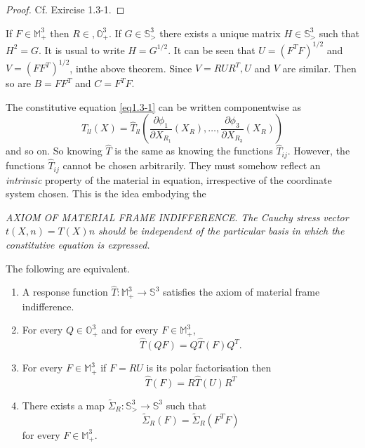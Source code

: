\begin{proof}
Cf. Exircise 1.3-1. 
\end{proof}

\begin{dashremark}%
If $F \in \mathbb{M}^3_+$ then $R \in , \mathbb{O}^3_+$. If $G \in
\mathbb{S}^3_>$ there exists a unique matrix $H \in \mathbb{S}^3_>$
such that $H^2=G$. It is usual to write $H =G^{1/2}$. It can be seen
that $U=(F^TF)^{1/2}$ and $V= (FF^T)^{1/2}$, in\pageoriginale the above
theorem. Since $V= R U R^T, U$ and $V$ are similar. Then so are $B
=FF^T$ and $C=F^TF$.  
\end{dashremark}

The constitutive equation \eqref{eq1.3-1} can be written componentwise as 
$$
T_{ll}(X)= \hat{T}_{ll} \left( \frac{\partial \phi_1}{\partial
  X_{R_1}}(X_R), \ldots , \frac{\partial \phi_3}{\partial
  X_{R_3}}(X_R)\right) 
$$
and so on. So knowing $\hat{T}$ is the same as knowing the functions
$\hat{T}_{ij}$. However, the functions $\hat{T}_{ij}$ cannot be chosen
arbitrarily. They must somehow reflect an \textit{intrinsic} property
of the material in equation, irrespective of the coordinate system
chosen. This is the idea embodying the  

\medskip
\noindent
\textit{AXIOM OF MATERIAL FRAME INDIFFERENCE}. \textit{The Cauchy
  stress vector $t(X, n)= T(X)n$ should be
  independent of the 
  particular basis in which the constitutive equation is expressed.} 

\begin{theorem}\label{chap1-thm1.3.2} %
The following are equivalent. 
\begin{enumerate}[\rm(i)]
\item A response function $\hat{T}: \mathbb{M}^3_+ \to \mathbb{S}^3$
  satisfies the axiom of material frame indifference.  
\item For every $Q \in \mathbb{O}^3_+$ and for every $F \in \mathbb{M}^3_+$, 
  \begin{equation*}
    \hat{T}(QF)= Q \hat{T}(F)Q^T. \tag{1.3-4}\label{eq1.3.4}
  \end{equation*}
\item For every $F \in \mathbb{M}^3_+$ if $F=RU$ is its polar
  factorisation then  
  \begin{equation*}
    \hat{T}(F)= R \hat{T}(U)R^T \tag{1.3-5}\label{eq1.3.5}
  \end{equation*}
\item There exists a map $\tilde{\Sigma}_R: \mathbb{S}^3_> \to
  \mathbb{S}^3$ such that  
  \begin{equation*}
    \tilde{\Sigma}_R (F)= \tilde{\Sigma}_R(F^T F) \tag{1.3-6}\label{eq1.3-6}
  \end{equation*}\pageoriginale
  for every $F \in \mathbb{M}^3_+$. 
\end{enumerate}
\end{theorem}

